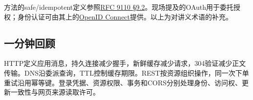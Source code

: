 方法的safe/idempotent定义参照\href{https://www.rfc-editor.org/rfc/rfc9110.html\#section-9.2}{RFC 9110 \S9.2}。现场提及的OAuth用于委托授权；身份认证可由其上的\href{https://openid.net/specs/openid-connect-core-1_0.html\#Introduction}{OpenID Connect}提供。以上为对讲义术语的补充。

\subsection{一分钟回顾}

HTTP定义应用消息，持久连接减少握手，新鲜缓存减少请求，304验证减少正文传输。DNS沿委派查询，TTL控制缓存期限。REST按资源组织操作，同一次下单重试沿用幂等键。登录凭据、资源权限、事务和CORS分别处理身份、访问权、更新一致性与网页来源读取许可。
\endgroup
